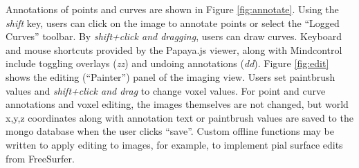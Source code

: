Annotations of points and curves are shown in Figure \ref{fig:annotate}. Using the \textit{shift} key, users can click on the image to annotate points or select the ``Logged Curves'' toolbar. By \textit{shift+click and dragging}, users can draw curves. Keyboard and mouse shortcuts provided by the Papaya.js viewer, along with Mindcontrol include toggling overlays (\textit{zz}) and undoing annotations (\textit{dd}). Figure \ref{fig:edit} shows the editing (``Painter'') panel of the imaging view. Users set paintbrush values and \textit{shift+click and drag} to change voxel values. For point and curve annotations and voxel editing, the images themselves are not changed, but world x,y,z coordinates along with annotation text or paintbrush values are saved to the mongo database when the user clicks ``save''. Custom offline functions may be written to apply editing to images, for example, to implement pial surface edits from FreeSurfer. 